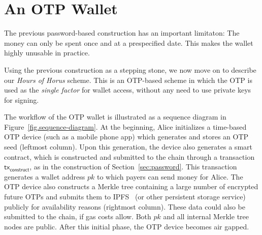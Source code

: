 \section{An OTP Wallet}

The previous password-based construction has an important limitaton:
The money can only be spent once and at a prespecified date. This makes
the wallet highly unusable in practice.

Using the previous construction as a stepping stone,
we now move on to describe our \emph{Hours of Horus} scheme.
This is an OTP-based scheme in which the OTP is used as the \emph{single factor}
for wallet access, without any need to use private keys for signing.

The workflow of the OTP wallet is illustrated as a sequence diagram
in Figure~\ref{fig.sequence-diagram}. At the beginning, Alice initializes
a time-based OTP device (such as a mobile phone app) which
generates and stores an OTP seed (leftmost column). Upon this generation, the device also
generates a smart contract, which is constructed and submitted to the chain
through a transaction $\textsf{tx}_\textsf{construct}$, as in the construction of
Section~\ref{sec:password}. This transaction generates a wallet address $pk$ to which
payers can send money for Alice. The OTP device also constructs a Merkle tree containing
a large number of encrypted future OTPs and submits them to IPFS~\cite{ipfs} (or other persistent storage service)
publicly for availability reasons (rightmost column). These data could also be submitted to the chain, if
gas costs allow. Both $pk$ and all internal Merkle tree nodes are public. After this
initial phase, the OTP device becomes air gapped.

